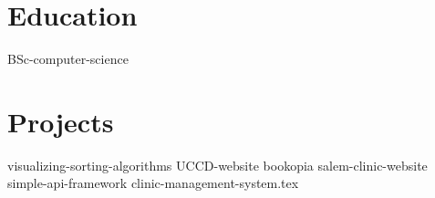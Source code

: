 \documentclass[a4paper,11pt]{article}
\makeatletter
\newcommand{\resumeItem}[1]{
  \item\small{#1}
}
\newcommand{\resumeItemListStart}{\begin{itemize}[rightmargin=0.11in]}
\newcommand{\resumeItemListEnd}{\end{itemize}}
\newcommand{\resumeTrioHeading}[3]{
  \item\small{
    \begin{tabular*}{0.96\textwidth}[t]{
      l@{\extracolsep{\fill}}c@{\extracolsep{\fill}}r
    }
      \textbf{#1} & \textit{#2} & #3
    \end{tabular*}
  }
}
\newcommand{\resumeHeadingListStart}{
  \begin{itemize}[leftmargin=0.15in, label={}]
}
\newcommand{\resumeHeadingListEnd}{\end{itemize}}
\makeatother
\begin{document}

\section{Education}
  \resumeHeadingListStart{}
    {BSc-computer-science}
  \resumeHeadingListEnd{}



\section{Projects}
  \resumeHeadingListStart{}
    {visualizing-sorting-algorithms}
\pagebreak
    {UCCD-website}
    {bookopia}
    {salem-clinic-website}
    {simple-api-framework}
    {clinic-management-system.tex}
  \resumeHeadingListEnd{}



\end{document}
